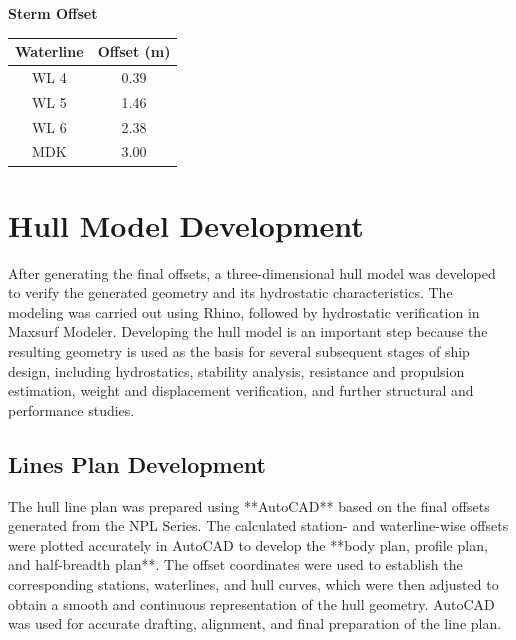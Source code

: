 \documentclass[12pt,a4paper,twoside]{report}
\begin{document}
\begin{table}[H]
\begin{minipage}[t]{0.48\textwidth}
\end{minipage}
\hfill
\begin{minipage}[t]{0.48\textwidth}
\centering
\textbf{Sterm Offset}

\vspace{2mm}

\begin{tabular}{cc}
\toprule
\textbf{Waterline} & \textbf{Offset (m)} \\
\midrule
WL 4 & 0.39 \\
WL 5 & 1.46 \\
WL 6 & 2.38 \\
MDK  & 3.00 \\
\bottomrule
\end{tabular}


\end{minipage}

\end{table}
\section{Hull Model Development}
After generating the final offsets, a three-dimensional hull model was developed to verify the generated geometry and its hydrostatic characteristics. The modeling was carried out using Rhino, followed by hydrostatic verification in Maxsurf Modeler. Developing the hull model is an important step because the resulting geometry is used as the basis for several subsequent stages of ship design, including hydrostatics, stability analysis, resistance and propulsion estimation, weight and displacement verification, and further structural and performance studies.
\subsection{Lines Plan Development}
The hull line plan was prepared using **AutoCAD** based on the final offsets generated from the NPL Series. The calculated station- and waterline-wise offsets were plotted accurately in AutoCAD to develop the **body plan, profile plan, and half-breadth plan**. The offset coordinates were used to establish the corresponding stations, waterlines, and hull curves, which were then adjusted to obtain a smooth and continuous representation of the hull geometry. AutoCAD was used for accurate drafting, alignment, and final preparation of the line plan. \cite{autocad}
\end{document}
